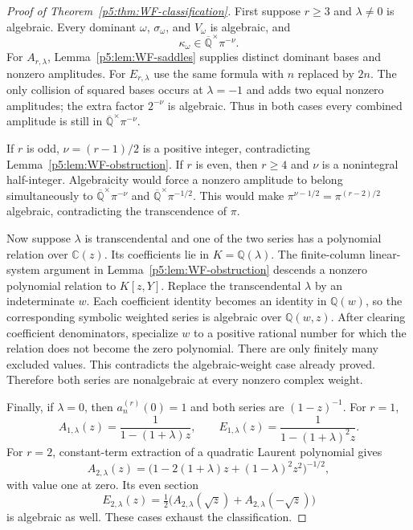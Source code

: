 \documentclass[11pt,a4paper]{article}
\theoremstyle{definition}
\theoremstyle{remark}
\numberwithin{equation}{section}
\begin{document}
\begin{proof}[Proof of Theorem~\ref{p5:thm:WF-classification}]
First suppose $r\ge3$ and $\lambda\ne0$ is algebraic. Every dominant
$\omega$, $\sigma_\omega$, and $V_\omega$ is algebraic, and
\[
 \kappa_\omega\in
    \overline{\mathbb Q}^{\times}\pi^{-\nu}.
\]
For $A_{r,\lambda}$, Lemma~\ref{p5:lem:WF-saddles} supplies distinct
dominant bases and nonzero amplitudes. For $E_{r,\lambda}$ use the
same formula with $n$ replaced by $2n$. The only collision of squared
bases occurs at $\lambda=-1$ and adds two equal nonzero amplitudes;
the extra factor $2^{-\nu}$ is algebraic. Thus in both cases every
combined amplitude is still in
$\overline{\mathbb Q}^{\times}\pi^{-\nu}$.

If $r$ is odd, $\nu=(r-1)/2$ is a positive integer, contradicting
Lemma~\ref{p5:lem:WF-obstruction}. If $r$ is even, then $r\ge4$ and
$\nu$ is a nonintegral half-integer. Algebraicity would force a
nonzero amplitude to belong simultaneously to
$\overline{\mathbb Q}^{\times}\pi^{-\nu}$ and
$\overline{\mathbb Q}^{\times}\pi^{-1/2}$. This would make
$\pi^{\nu-1/2}=\pi^{(r-2)/2}$ algebraic, contradicting the
transcendence of $\pi$.

Now suppose $\lambda$ is transcendental and one of the two series
has a polynomial relation over $\mathbb C(z)$. Its coefficients lie
in $K=\mathbb Q(\lambda)$. The finite-column linear-system argument
in Lemma~\ref{p5:lem:WF-obstruction} descends a nonzero polynomial
relation to $K[z,Y]$. Replace the transcendental $\lambda$ by an
indeterminate $w$. Each coefficient identity becomes an identity in
$\mathbb Q(w)$, so the corresponding symbolic weighted series is
algebraic over $\mathbb Q(w,z)$. After clearing coefficient
denominators, specialize $w$ to a positive rational number for which
the relation does not become the zero polynomial. There are only
finitely many excluded values. This contradicts the algebraic-weight
case already proved. Therefore both series are nonalgebraic at
every nonzero complex weight.

Finally, if $\lambda=0$, then $a_n^{(r)}(0)=1$ and both series
are $(1-z)^{-1}$. For $r=1$,
\[
 A_{1,\lambda}(z)=\frac1{1-(1+\lambda)z},\qquad
 E_{1,\lambda}(z)=\frac1{1-(1+\lambda)^2z}.
\]
For $r=2$, constant-term extraction of a quadratic Laurent polynomial
gives
\[
 A_{2,\lambda}(z)
 =\bigl(1-2(1+\lambda)z+(1-\lambda)^2z^2\bigr)^{-1/2},
\]
with value one at zero. Its even section
\[
 E_{2,\lambda}(z)
 =\tfrac12\bigl(A_{2,\lambda}(\sqrt z)
                         +A_{2,\lambda}(-\sqrt z)\bigr)
\]
is algebraic as well. These cases exhaust the classification.
\end{proof}
\end{document}

